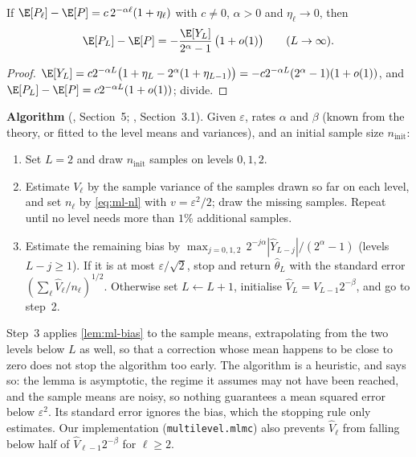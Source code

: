 \begin{lemma}\label{lem:ml-bias}
If $\E[P_\ell]-\E[P]=c\,2^{-\alpha\ell}(1+\eta_\ell)$ with $c\ne0$, $\alpha>0$ and $\eta_\ell\to0$,
then
\[
  \E[P_L]-\E[P]=-\frac{\E[Y_L]}{2^\alpha-1}\,\big(1+o(1)\big)\qquad(L\to\infty).
\]
\end{lemma}

\begin{proof}
$\E[Y_L]=c2^{-\alpha L}\big(1+\eta_L-2^\alpha(1+\eta_{L-1})\big)=-c2^{-\alpha L}(2^\alpha-1)(1+o(1))$,
and $\E[P_L]-\E[P]=c2^{-\alpha L}(1+o(1))$; divide.
\end{proof}

\medskip\noindent\textbf{Algorithm} (\citealp{giles-mlmc}, Section~5; \citealp{giles-acta}, Section~3.1).
Given $\varepsilon$, rates $\alpha$ and $\beta$ (known from the theory, or fitted to the level
means and variances), and an initial sample size $n_{\mathrm{init}}$:
\begin{enumerate}[label=\arabic*.]
  \item Set $L=2$ and draw $n_{\mathrm{init}}$ samples on levels $0,1,2$.
  \item Estimate $V_\ell$ by the sample variance of the samples drawn so far on each level, and set
    $n_\ell$ by \eqref{eq:ml-nl} with $v=\varepsilon^2/2$; draw the missing samples. Repeat until no
    level needs more than $1\%$ additional samples.
  \item Estimate the remaining bias by $\max_{j=0,1,2}\,2^{-j\alpha}|\hat Y_{L-j}|/(2^\alpha-1)$
    (levels $L-j\ge1$). If it is at most $\varepsilon/\sqrt2$, stop and return
    $\hat\theta_L$ with the standard error $(\sum_\ell\hat V_\ell/n_\ell)^{1/2}$. Otherwise set
    $L\leftarrow L+1$, initialise $\hat V_{L}=\hat V_{L-1}2^{-\beta}$, and go to step~2.
\end{enumerate}
Step~3 applies \cref{lem:ml-bias} to the sample means, extrapolating from the two levels below
$L$ as well, so that a correction whose mean happens to be close to zero does not stop the
algorithm too early. The algorithm is a heuristic, and \textcite{giles-acta} says so: the lemma is
asymptotic, the regime it assumes may not have been reached, and the sample means are noisy, so
nothing guarantees a mean squared error below $\varepsilon^2$. Its standard error ignores the
bias, which the stopping rule only estimates. Our implementation (\texttt{multilevel.mlmc}) also
prevents $\hat V_\ell$ from falling below half of $\hat V_{\ell-1}2^{-\beta}$ for $\ell\ge2$.

